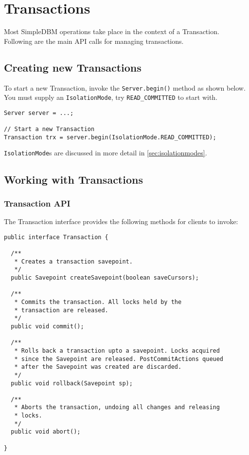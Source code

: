\documentclass[a4paper,draft,oneside]{book}
\begin{document}
\chapter{Transactions}

Most SimpleDBM operations take place in the context of a Transaction.
Following are the main API calls for managing transactions.

\section{Creating new Transactions}

To start a new Transaction, invoke the \verb|Server.begin()| method as
shown below. You must supply an \verb|IsolationMode|, try
\verb|READ_COMMITTED| to start with.

\begin{verbatim}
Server server = ...;

// Start a new Transaction
Transaction trx = server.begin(IsolationMode.READ_COMMITTED);

\end{verbatim}

\verb|IsolationMode|s are discussed in more detail in \ref{sec:isolationmodes}.

\section{Working with Transactions}

\subsection{Transaction API}

The Transaction interface provides the following methods for clients
to invoke:

\begin{verbatim}
public interface Transaction {
	
  /**
   * Creates a transaction savepoint.
   */
  public Savepoint createSavepoint(boolean saveCursors);

  /**
   * Commits the transaction. All locks held by the
   * transaction are released.
   */
  public void commit();	

  /**
   * Rolls back a transaction upto a savepoint. Locks acquired
   * since the Savepoint are released. PostCommitActions queued
   * after the Savepoint was created are discarded.
   */
  public void rollback(Savepoint sp);	

  /**
   * Aborts the transaction, undoing all changes and releasing 
   * locks.
   */
  public void abort();

}
\end{verbatim}
\end{document}
